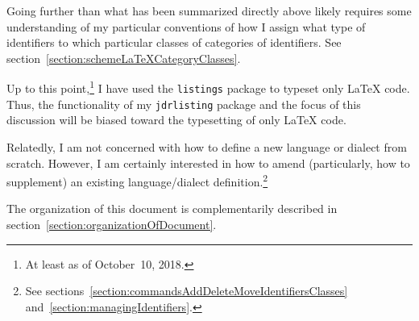 \documentclass[12pt,table,final]{article}%
\begin{document}
Going further than what has been summarized directly above likely requires some understanding of my particular conventions of how I assign what type of identifiers to which particular classes of categories of identifiers. See section~\ref{section:schemeLaTeXCategoryClasses}.

Up to this point,\footnote{At least as of October~10, 2018.} I have used the \lstinline$listings$ package  to typeset only \LaTeX{} code. Thus, the functionality of my \lstinline$jdrlisting$ package and the focus of this discussion will be biased toward the typesetting of only \LaTeX{} code.

Relatedly, I am not concerned with how to define a new language or dialect from scratch. However, I am certainly interested in how to amend (particularly, how to supplement) an existing language/dialect definition.\footnote{See sections~\ref{section:commandsAddDeleteMoveIdentifiersClasses} and~\ref{section:managingIdentifiers}.}

The organization of this document is complementarily described in section~\ref{section:organizationOfDocument}.
\end{document}
